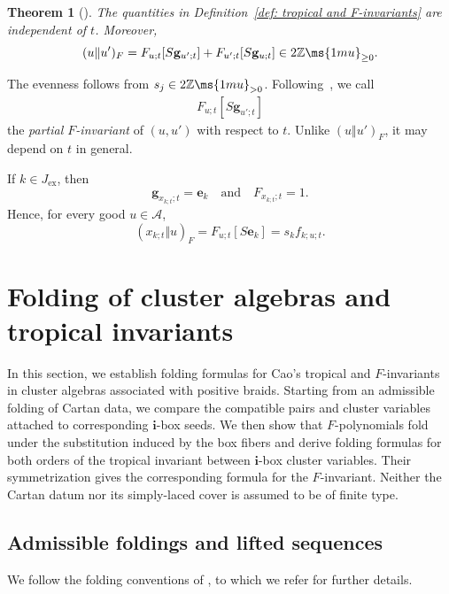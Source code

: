 \documentclass[12pt, leqno]{amsart}
\numberwithin{equation}{section}
\theoremstyle{plain}
\newtheorem{theorem}[lemma]{Theorem}
\theoremstyle{definition}
\newcommand{\ex}{\mathrm{ex}}
\newcommand{\Z}{\mathbb{Z}\ms{1mu}}
\newcommand{\bfg}{\mathbf{g}}
\newcommand{\bfi}{\mathbf{i}}
\newcommand{\calA}{\mathcal{A}}
\newcommand{\qtq}[1][{and}]{\quad\text{{#1}}\quad}
\begin{document}
\begin{theorem}[{\cite[Theorem~4.10]{Cao23}}]
\label{thm: Cao F-invariant}
The quantities in {\rm Definition~\ref{def: tropical and F-invariants}} are independent of
\(t\).  Moreover,
\[
(u\Vert u')_F = F_{u;t}[S\bfg_{u';t}] + F_{u';t}[S\bfg_{u;t}] \in2\Z_{\geq0}.
\]
\end{theorem}

The evenness follows from \(s_j\in2\Z_{>0}\).  Following~\cite{CFM26}, we call
\begin{align} \label{eq: frako}
F_{u;t}[S\bfg_{u';t}]
\end{align}
the \emph{partial \(F\)-invariant} of \((u,u')\) with respect to
\(t\). Unlike \((u\Vert u')_F\), it may depend on \(t\) in general.

If \(k\in J_{\ex}\), then
\[
\bfg_{x_{k;t};t}=\mathbf e_k \qtq F_{x_{k;t};t}=1.
\]
Hence, for every good \(u\in\calA\),
\begin{equation}\label{eq: F-invariant with initial variable}
(x_{k;t}\Vert u)_F = F_{u;t}[S\mathbf e_k] = s_kf_{k;u;t}.
\end{equation}

\section{Folding of cluster algebras and tropical invariants}
\label{sec: folding cluster algebras}

In this section, we establish folding formulas for Cao's tropical
and \(F\)-invariants in cluster algebras associated with positive
braids.
Starting from an admissible folding of Cartan data, we compare
the compatible pairs and cluster variables attached to
corresponding \(\bfi\)-box seeds.
We then show that \(F\)-polynomials fold under the substitution
induced by the box fibers and derive folding formulas for both
orders of the tropical invariant between \(\bfi\)-box cluster
variables.  Their symmetrization gives the corresponding formula
for the \(F\)-invariant.
Neither the Cartan datum nor its simply-laced cover is assumed
to be of finite type.

\subsection{Admissible foldings and lifted sequences}
\label{subsec: admissible foldings and lifted sequences}

We follow the folding conventions of 
\cite[Sections~2.1--2.3]{JO26}, to which we refer for further details.
\end{document}
